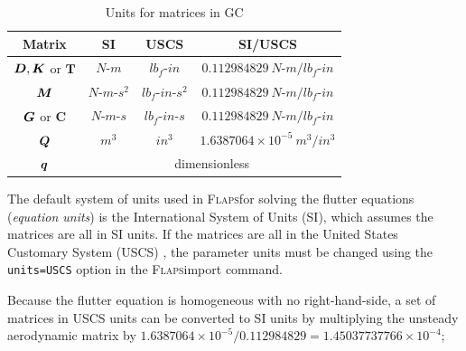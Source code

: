 \documentclass[10pt,openany,twoside]{book}
\numberwithin{equation}{section}   %
\newcommand{\Cmd}[1]{{\sf #1}}
\newcommand{\Newterm}[1]{{\em #1}}
\newcommand{\Code}[1]{{\small\tt #1}}
\newcommand{\Matrix}[1]{\boldsymbol{#1}}
\newcommand{\Vector}[1]{\boldsymbol{#1}}
\newcommand{\Gc}{GC}
\newcommand{\Flaps}{{\normalfont\scshape Flaps\:}}
\begin{document}
\begin{table}[hbt] %
\begin{center}
\begin{sloppypar}
\begin{tabular}{|c|c|c|c|} \hline
{\bf Matrix}       & {\bf SI }   & {\bf USCS}  & {\bf SI/USCS}     \\ \hline \hline
$\rule{0mm}{4mm} \Matrix{D}, \Matrix{K}$ or $\Matrix{T}$ & $N\text{-}m$ & $lb_f\text{-}in$ & $0.112984829 \: N\text{-}m/lb_f\text{-}in$  \\ \hline
$\rule{0mm}{4mm} \Matrix{M}$  & $N\text{-}m\text{-}s^2$         & $lb_f\text{-}in\text{-}s^2$ & $0.112984829 \: N\text{-}m/lb_f\text{-}in$  \\ \hline
$\rule{0mm}{4mm} \Matrix{G}$ or $\Matrix{C}$ & $N\text{-}m\text{-}s$ &
		$lb_f\text{-}in\text{-}s$ & $0.112984829 \: N\text{-}m/lb_f\text{-}in$ \\ \hline
$\rule{0mm}{4mm} \Matrix{Q}$     & $m^3$ & $in^3$ & $1.6387064 \times 10^{-5} \: m^3/in^3$     \\ \hline
$\rule{0mm}{4mm}\Vector{q}$ & \multicolumn{3}{c|}{dimensionless}                             \\ \hline
\end{tabular}
\end{sloppypar}
\caption{Units for matrices in \Gc} \label{table:matrix-units}
\end{center}
\end{table}



The default system of units used in \Flaps for solving the flutter
equations (\Newterm{equation units}) is the International
System of Units (SI), which assumes the matrices are all in SI units.
If the matrices are all in the United States Customary System (USCS)
\cite{handbook2002specifications},
the parameter units must be changed using the \Code{units=USCS}
option in the \Flaps \Cmd{import} command.

Because the flutter equation is homogeneous with no right-hand-side, a set
of matrices in USCS units can be converted to SI units by multiplying the unsteady
aerodynamic matrix by
$1.6387064\times10^{-5}/0.112984829 = 1.45037737766 \times 10^{-4}$;

\end{document}
